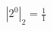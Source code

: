 \documentclass[preview]{standalone}
\begin{document}
\begin{align*}
\left| 2^{0} \right|_2 = \frac{1}{1}
\end{align*}
\end{document}
